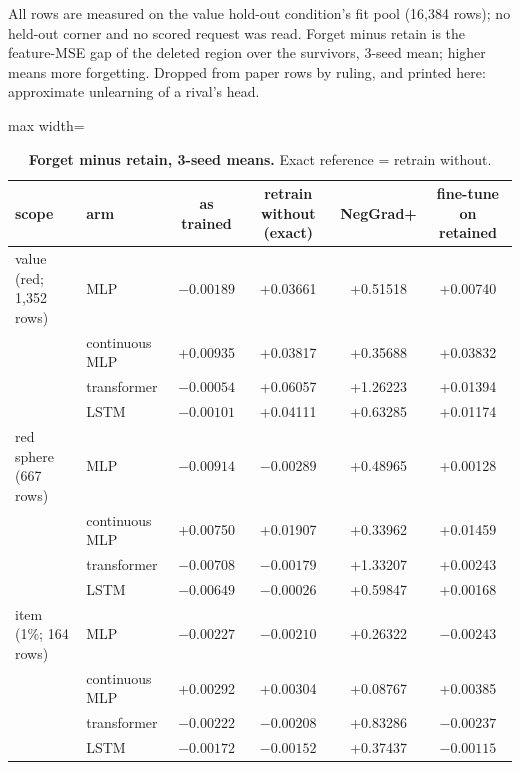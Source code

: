 \documentclass{article} %
\begin{document}
All rows are measured on the value hold-out condition's fit pool (16,384 rows); no held-out corner %
and no scored request was read. Forget minus retain is the feature-MSE gap of the deleted region
over the survivors, 3-seed mean; higher means more forgetting. Dropped from paper rows by ruling,
and printed here: approximate unlearning of a rival's head.

\begin{table}[h]
\centering\small
\caption{\textbf{Forget minus retain, 3-seed means.} Exact reference = retrain without.}
\label{tab:unlearn}
\setlength{\tabcolsep}{3pt}
\begin{adjustbox}{max width=\linewidth}\begin{tabular}{llcccc}
\toprule
scope & arm & as trained & retrain without (exact) & NegGrad+ & fine-tune on retained \\
\midrule
value (red; 1,352 rows) & MLP & $-0.00189$ & +0.03661 & +0.51518 & +0.00740 \\
 & continuous MLP & +0.00935 & +0.03817 & +0.35688 & +0.03832 \\
 & transformer & $-0.00054$ & +0.06057 & +1.26223 & +0.01394 \\
 & LSTM & $-0.00101$ & +0.04111 & +0.63285 & +0.01174 \\
red sphere (667 rows) & MLP & $-0.00914$ & $-0.00289$ & +0.48965 & +0.00128 \\
 & continuous MLP & +0.00750 & +0.01907 & +0.33962 & +0.01459 \\
 & transformer & $-0.00708$ & $-0.00179$ & +1.33207 & +0.00243 \\
 & LSTM & $-0.00649$ & $-0.00026$ & +0.59847 & +0.00168 \\
item (1\%; 164 rows) & MLP & $-0.00227$ & $-0.00210$ & +0.26322 & $-0.00243$ \\
 & continuous MLP & +0.00292 & +0.00304 & +0.08767 & +0.00385 \\
 & transformer & $-0.00222$ & $-0.00208$ & +0.83286 & $-0.00237$ \\
 & LSTM & $-0.00172$ & $-0.00152$ & +0.37437 & $-0.00115$ \\
\bottomrule
\end{tabular}\end{adjustbox}
\end{table}
\end{document}

